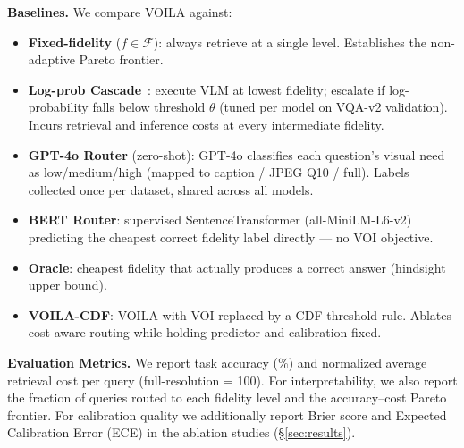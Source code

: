 \textbf{Baselines.}
We compare \textsc{VOILA} against:
\begin{itemize}[nosep]
    \item \textbf{Fixed-fidelity} ($f \in \mathcal{F}$): always retrieve at a single level. Establishes the non-adaptive Pareto frontier.
    \item \textbf{Log-prob Cascade}~\cite{chen2023frugalgpt}: execute VLM at lowest fidelity; escalate if log-probability falls below threshold $\theta$ (tuned per model on VQA-v2 validation). Incurs retrieval and inference costs at every intermediate fidelity.
    \item \textbf{GPT-4o Router} (zero-shot): GPT-4o classifies each question's visual need as low/medium/high (mapped to caption / JPEG Q10 / full). Labels collected once per dataset, shared across all models.
    \item \textbf{BERT Router}: supervised SentenceTransformer (all-MiniLM-L6-v2) predicting the cheapest correct fidelity label directly --- no VOI objective.
    \item \textbf{Oracle}: cheapest fidelity that actually produces a correct answer (hindsight upper bound).
    \item \textbf{\textsc{VOILA}-CDF}: \textsc{VOILA} with VOI replaced by a CDF threshold rule. Ablates cost-aware routing while holding predictor and calibration fixed.
\end{itemize}

\textbf{Evaluation Metrics.}
We report task accuracy (\%) and normalized average retrieval cost per query (full-resolution = 100). For interpretability, we also report the fraction of queries routed to each fidelity level and the accuracy--cost Pareto frontier.
For calibration quality we additionally report Brier score and Expected Calibration Error (ECE) in the ablation studies (\S\ref{sec:results}).
